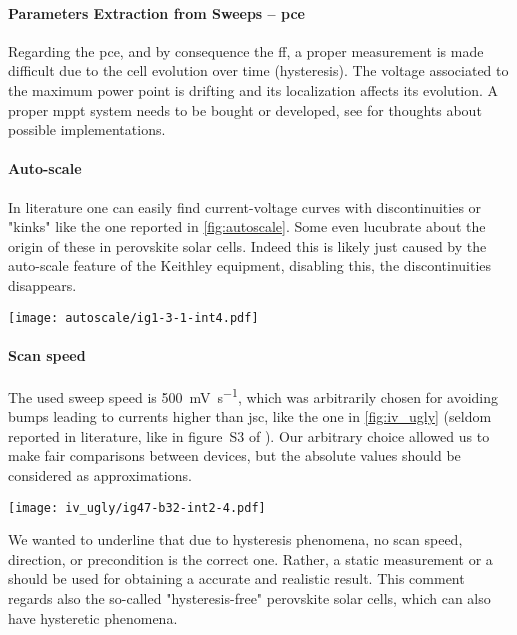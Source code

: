 	\paragraph{Parameters Extraction from Sweeps -- \gls{pce}} Regarding the \gls{pce}, and by consequence the \gls{ff}, a proper measurement is made difficult due to the cell evolution over time (hysteresis). The voltage associated to the maximum power point is drifting and its localization affects its evolution. A proper \gls{mppt} system needs to be bought or developed, see  for thoughts about possible implementations.

	\paragraph{Auto-scale}\label{autoscale} In literature one can easily find current-voltage curves with discontinuities or "kinks" \cite{Li2016,Snaith2014,Zhang2015} like the one reported in \cref{fig:autoscale}. Some even lucubrate about the origin of these in perovskite solar cells. Indeed this is likely just caused by the auto-scale feature of the Keithley equipment, disabling this, the discontinuities disappears.

	\begin{SCfigure}%
		\centering
		\texttt{[image: autoscale/ig1-3-1-int4.pdf]}
		\label{fig:autoscale}
	\end{SCfigure}

	\paragraph{Scan speed} The used sweep speed is \SI{500}{\mV\per\s}, which was arbitrarily chosen for avoiding bumps leading to currents higher than \gls{jsc}, like the one in \cref{fig:iv_ugly} (seldom reported in literature, like in figure~S3 of \cite{Du2018}). %
	Our arbitrary choice allowed us to make fair comparisons between devices, but the absolute values should be considered as approximations.
	\begin{SCfigure}%
		\centering
		\texttt{[image: iv\_ugly/ig47-b32-int2-4.pdf]}
		\label{fig:iv_ugly}
	\end{SCfigure}
	We wanted to underline that due to hysteresis phenomena, no scan speed, direction, or precondition is the correct one.  %
	Rather, a static measurement or a  should be used for obtaining a accurate and realistic result.
	This comment regards also the so-called "hysteresis-free" perovskite solar cells, which can also have hysteretic phenomena\cite{Jacobs2018,Du2018}.

